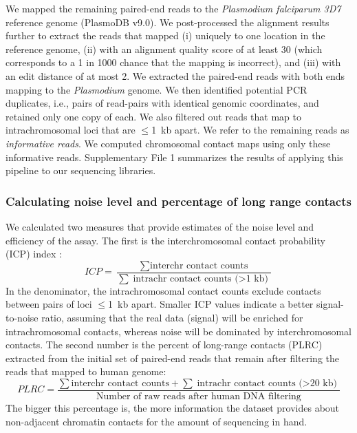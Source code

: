 We mapped the remaining paired-end reads to the \emph{Plasmodium falciparum 3D7}
reference genome (PlasmoDB v9.0). We post-processed the alignment results further
to extract the reads that mapped (i) uniquely to one location in the reference
genome, (ii) with an alignment quality score of at least 30 (which corresponds to
a 1 in 1000 chance that the mapping is incorrect), and (iii) with an edit distance
of at most 2. We extracted the paired-end reads with both ends mapping to the
{\em Plasmodium} genome. We then identified potential PCR duplicates, i.e., pairs
of read-pairs with identical genomic coordinates, and retained only one copy of
each. We also filtered out reads that map to intrachromosomal loci that are
$\le$1~kb apart. We refer to the remaining reads as \emph{informative reads}. We
computed chromosomal contact maps using only these informative reads. Supplementary
File 1 summarizes the results of applying this pipeline to our sequencing libraries.


\subsubsection*{Calculating noise level and percentage of long range contacts}
\label{met:ICP}
We calculated two measures that provide estimates of the noise level and efficiency
of the assay. The first is the interchromosomal contact probability (ICP)
index \citep{kalhor:genome}:
\[
ICP=\frac{\sum{\text{interchr contact counts}}} {\sum{\text{intrachr contact counts ($>$1 kb)}}}
\]
In the denominator, the intrachromosomal contact counts exclude contacts between
pairs of loci $\le$1~kb apart. Smaller ICP values indicate a better signal-to-noise
ratio, assuming that the real data (signal) will be enriched for intrachromosomal
contacts, whereas noise will be dominated by interchromosomal contacts. The second
number is the percent of long-range contacts (PLRC) extracted from the initial set
of paired-end reads that remain after filtering the reads that mapped to human genome:
\[
PLRC=\frac{\sum{\text{interchr contact counts}} + \sum{\text{intrachr contact counts ($>$20 kb)}}} {\text{Number of raw reads after human DNA filtering}}
\]
The bigger this percentage is, the more information the dataset provides about
non-adjacent chromatin contacts for the amount of sequencing in hand.


